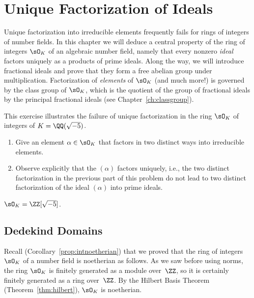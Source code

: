 
\chapter{Unique Factorization of Ideals}

Unique factorization into irreducible elements frequently fails for
rings of integers of number fields.  In this chapter we will deduce a
central property of the ring of integers $\sO_K$ of an algebraic number
field, namely that every nonzero {\em ideal} factors uniquely as a
products of prime ideals.  Along the way, we will introduce fractional
ideals and prove that they form a free abelian group under
multiplication.  Factorization of {\em elements} of $\sO_K$ (and much
more!) is governed by the class group of $\sO_K$, which is the quotient
of the group of fractional ideals by the principal fractional ideals
(see Chapter~\ref{ch:classgroup}).

\begin{exercise}
  This exercise illustrates the failure of unique factorization in the ring
  $\sO_K$ of integers of $K = \QQ(\sqrt{-5})$.
  \begin{enumerate}
    \item Give an element $\alpha \in \sO_K$ that factors in two distinct
    ways into irreducible elements.
    \item Observe explicitly that the $(\alpha)$ factors uniquely, i.e.,
    the two distinct factorization in the previous part of this problem
    do not lead to two distinct factorization of the ideal $(\alpha)$
    into prime ideals.
  \end{enumerate}
  \begin{hint}
    $\sO_K = \ZZ[\sqrt{-5}]$.
  \end{hint}
\end{exercise}

\section{Dedekind Domains}

Recall (Corollary~\ref{prop:intnoetherian}) that we proved that the
ring of integers $\sO_K$ of a number field is noetherian as follows.
As we saw before using norms, the ring $\sO_K$ is finitely generated as
a module over~$\ZZ$, so it is certainly finitely generated as a ring
over~$\ZZ$.  By the Hilbert Basis Theorem (Theorem~\ref{thm:hilbert}),
$\sO_K$ is noetherian.

